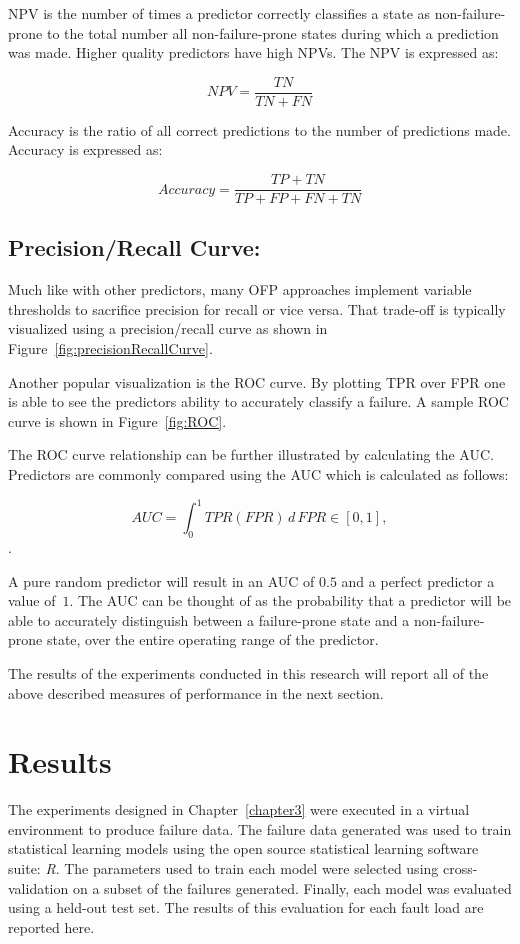 \ac{NPV} is the number of times a predictor correctly classifies a state as
non-failure-prone to the total number all non-failure-prone states during which
a prediction was made.  Higher quality predictors have high \ac{NPV}s.  The
\ac{NPV} is expressed as:

\[ \mathit{NPV}
	= \dfrac{TN}{TN + FN}
\]

Accuracy is the ratio of all correct predictions to the number of predictions
made.  Accuracy is expressed as:

\[ Accuracy 
	= \dfrac{TP + TN}{TP + FP + FN + TN}
\]

\subsection{Precision/Recall Curve:}
Much like with other predictors, many \ac{OFP} approaches implement variable
thresholds to sacrifice precision for recall or vice versa.  That trade-off is
typically visualized using a precision/recall curve as shown in
Figure~\ref{fig:precisionRecallCurve}.

\figprecisionRecallCurve{3in}

Another popular visualization is the \ac{ROC} curve.  By plotting \ac{TPR} over
\ac{FPR} one is able to see the predictors ability to accurately classify a
failure.  A sample \ac{ROC} curve is shown in Figure~\ref{fig:ROC}.

\figROC{3in}

The \ac{ROC} curve relationship can be further illustrated by calculating the
\ac{AUC}.  Predictors are commonly compared using the \ac{AUC} which is
calculated as follows:

$$AUC = \int_{0}^{1} \mathit{TPR}(\mathit{FPR}) \,d\,\mathit{FPR} \in [0,1],$$.

\noindent
A pure random predictor will result in an \ac{AUC} of $0.5$ and a perfect
predictor a value of~$1$.  The \ac{AUC} can be thought of as the probability
that a predictor will be able to accurately distinguish between a failure-prone
state and a non-failure-prone state, over the entire operating range of the
predictor.

The results of the experiments conducted in this research will report all of
the above described measures of performance in the next section.

\section{Results} \label{results}
The experiments designed in Chapter~\ref{chapter3} were executed in a virtual
environment to produce failure data.  The failure data generated was used to
train statistical learning models using the open source statistical learning
software suite: \emph{R}.  The parameters used to train each model were
selected using cross-validation on a subset of the failures generated.
Finally, each model was evaluated using a held-out test set.  The results of
this evaluation for each fault load are reported here.


